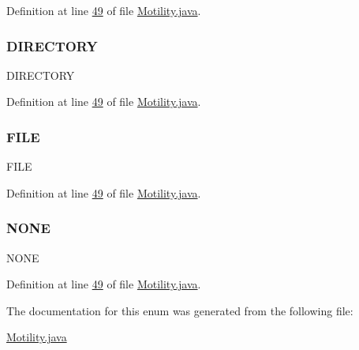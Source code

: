 Definition at line \hyperlink{_motility_8java_source_l00049}{49} of file \hyperlink{_motility_8java_source}{Motility.\+java}.

\hypertarget{enumanalysis_1_1_motility_1_1_type_of_analysis_ace72c1d90b5a48ebbddd2be5b5f9368f}{}\label{enumanalysis_1_1_motility_1_1_type_of_analysis_ace72c1d90b5a48ebbddd2be5b5f9368f} 
\subsubsection{\texorpdfstring{D\+I\+R\+E\+C\+T\+O\+RY}{DIRECTORY}}
{\footnotesize\ttfamily D\+I\+R\+E\+C\+T\+O\+RY}



Definition at line \hyperlink{_motility_8java_source_l00049}{49} of file \hyperlink{_motility_8java_source}{Motility.\+java}.

\hypertarget{enumanalysis_1_1_motility_1_1_type_of_analysis_a49ca3d2aae1b4847965178deb5633261}{}\label{enumanalysis_1_1_motility_1_1_type_of_analysis_a49ca3d2aae1b4847965178deb5633261} 
\subsubsection{\texorpdfstring{F\+I\+LE}{FILE}}
{\footnotesize\ttfamily F\+I\+LE}



Definition at line \hyperlink{_motility_8java_source_l00049}{49} of file \hyperlink{_motility_8java_source}{Motility.\+java}.

\hypertarget{enumanalysis_1_1_motility_1_1_type_of_analysis_a899caa602e4fff675b17cdbab33607ec}{}\label{enumanalysis_1_1_motility_1_1_type_of_analysis_a899caa602e4fff675b17cdbab33607ec} 
\subsubsection{\texorpdfstring{N\+O\+NE}{NONE}}
{\footnotesize\ttfamily N\+O\+NE}



Definition at line \hyperlink{_motility_8java_source_l00049}{49} of file \hyperlink{_motility_8java_source}{Motility.\+java}.



The documentation for this enum was generated from the following file\+:\begin{DoxyCompactItemize}
\item 
\hyperlink{_motility_8java}{Motility.\+java}\end{DoxyCompactItemize}
